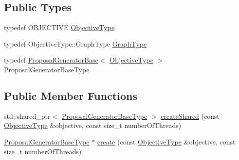 \subsection*{Public Types}
\begin{DoxyCompactItemize}
\item 
typedef O\+B\+J\+E\+C\+T\+I\+VE \hyperlink{classnifty_1_1graph_1_1opt_1_1common_1_1PyProposalGeneratorFactoryBase_a4fe277d44ed149a417d6d7acc76724c2}{Objective\+Type}
\item 
typedef Objective\+Type\+::\+Graph\+Type \hyperlink{classnifty_1_1graph_1_1opt_1_1common_1_1PyProposalGeneratorFactoryBase_a464658d64ebbe32ebade44d8d3288599}{Graph\+Type}
\item 
typedef \hyperlink{classnifty_1_1graph_1_1opt_1_1common_1_1ProposalGeneratorBase}{Proposal\+Generator\+Base}$<$ \hyperlink{classnifty_1_1graph_1_1opt_1_1common_1_1ProposalGeneratorFactoryBase_abb308b47da6f89126f786b394be0efc5}{Objective\+Type} $>$ \hyperlink{classnifty_1_1graph_1_1opt_1_1common_1_1PyProposalGeneratorFactoryBase_a028444f3f8ad9daec9a0deab559e21b0}{Proposal\+Generator\+Base\+Type}
\end{DoxyCompactItemize}
\subsection*{Public Member Functions}
\begin{DoxyCompactItemize}
\item 
std\+::shared\+\_\+ptr$<$ \hyperlink{classnifty_1_1graph_1_1opt_1_1common_1_1ProposalGeneratorFactoryBase_a262cfc7056a43871e15130dd4435dee7}{Proposal\+Generator\+Base\+Type} $>$ \hyperlink{classnifty_1_1graph_1_1opt_1_1common_1_1PyProposalGeneratorFactoryBase_a1e028a4615370fd13ed5eb9b3bb822a0}{create\+Shared} (const \hyperlink{classnifty_1_1graph_1_1opt_1_1common_1_1ProposalGeneratorFactoryBase_abb308b47da6f89126f786b394be0efc5}{Objective\+Type} \&objective, const size\+\_\+t number\+Of\+Threads)
\item 
\hyperlink{classnifty_1_1graph_1_1opt_1_1common_1_1ProposalGeneratorFactoryBase_a262cfc7056a43871e15130dd4435dee7}{Proposal\+Generator\+Base\+Type} $\ast$ \hyperlink{classnifty_1_1graph_1_1opt_1_1common_1_1PyProposalGeneratorFactoryBase_a15f89029ba9b9b3afe398551667ada0d}{create} (const \hyperlink{classnifty_1_1graph_1_1opt_1_1common_1_1ProposalGeneratorFactoryBase_abb308b47da6f89126f786b394be0efc5}{Objective\+Type} \&objective, const size\+\_\+t number\+Of\+Threads)
\end{DoxyCompactItemize}


